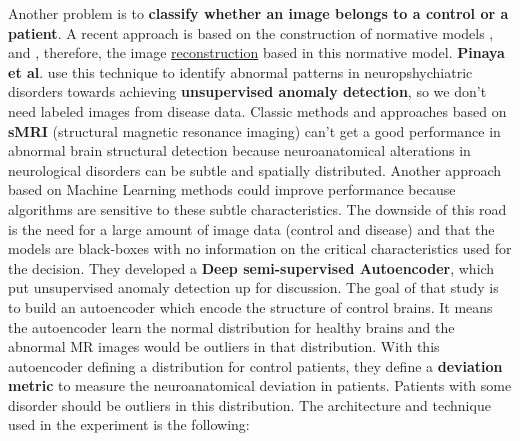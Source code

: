 Another problem is to \textbf{classify whether an image belongs to a control or a patient}. A recent approach is based on the construction of normative models \cite{marquand2016normative}, and , therefore, the image \underline{reconstruction} based in this normative model. \textbf{Pinaya et al}. \cite{pinaya2019} use this technique to identify abnormal patterns in neuropshychiatric disorders towards achieving \textbf{unsupervised anomaly detection}, so we don't need labeled images from disease data.
Classic methods and approaches based on \textbf{sMRI} (structural magnetic resonance imaging) can't get a good performance in abnormal brain structural detection because neuroanatomical alterations in neurological disorders can be subtle and spatially distributed. Another approach based on Machine Learning methods could improve performance because algorithms are sensitive to these subtle characteristics. The downside of this road is the need for a large amount of image data (control and disease) and that the models are black-boxes with no information on the critical characteristics used for the decision. They developed a \textbf{Deep semi-supervised Autoencoder}, which put unsupervised anomaly detection up for discussion.
The goal of that study is to build an autoencoder which encode the structure of control brains. It means the autoencoder learn the normal distribution for healthy brains and the abnormal MR images would be outliers in that distribution. With this autoencoder defining a distribution for control patients, they define a \textbf{deviation metric} to measure the neuroanatomical deviation in patients. Patients with some disorder should be outliers in this distribution. The architecture and technique used in the experiment is the following:

